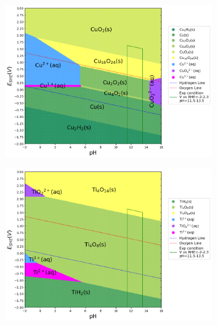 \documentclass[journal=jacsat,manuscript=article]{achemso}
\begin{document}
\begin{figure}[htbp]
\begin{subfigure}[b]{0.3\textwidth}
    \end{subfigure}
    \begin{subfigure}[b]{0.3\textwidth}
        \subcaption{}\label{fig:Cu_Pourbaix_H2O}
        \includegraphics[width=\textwidth]{Figures/pourbaix_diagrams/Cu-NH3-H2O_activity=1e-04_[NH3]=0M_[Gly]=0M_[CN]=0.png}
        \par\medskip   
    \end{subfigure}
    \begin{subfigure}[b]{0.3\textwidth}
        \includegraphics[width=\textwidth]{Figures/pourbaix_diagrams/Ti-NH3-H2O_activity=1e-04_[NH3]=0M_[Gly]=0M_[CN]=0.png}
        \subcaption{}\label{fig:Ti_Pourbaix_H2O}
    \end{subfigure}

\end{figure}
\end{document}
